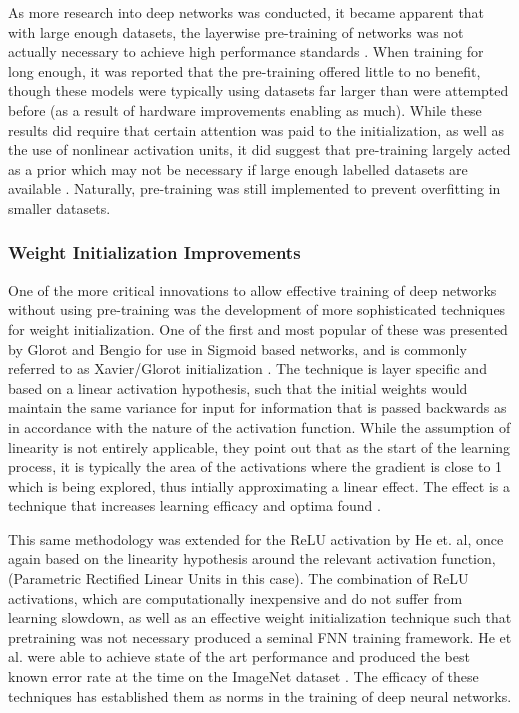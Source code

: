 \documentclass[a4paper,11pt,oneside]{article}
\theoremstyle{plain}
\theoremstyle{definition}
\begin{document}
As more research into deep networks was conducted, it became apparent that with large enough datasets, the
 layerwise pre-training of networks was not actually necessary to achieve high performance standards 
 \cite{ImageNet, Glorot2, Ciresan}. When training for long enough, it was reported that the pre-training offered little to no 
 benefit, though these models were typically using datasets far larger than were attempted before (as a result of
  hardware improvements enabling as much). While these results did require that certain attention was paid to the 
  initialization, as well as the use of nonlinear activation units, it did suggest that pre-training largely acted as a prior 
  which may not be necessary if large enough labelled datasets are available \cite{Bengio3}. Naturally, pre-training was still 
  implemented to prevent overfitting in smaller datasets.
\hfill \break 

\subsubsection{Weight Initialization Improvements}\label{lr_weight_init}

One of the more critical innovations to allow effective training of deep networks without using pre-training was the development of more sophisticated techniques for weight initialization. One of the first and most popular of these was presented by Glorot and Bengio for use in Sigmoid based networks, 
and is commonly referred to as Xavier/Glorot initialization \cite{Glorot}. The technique is layer specific and based on a linear activation
hypothesis, such that the initial weights would maintain the same variance for input for information that is passed backwards as in 
accordance with the nature of the activation function. While the assumption of linearity is not entirely applicable, they point out that as the 
start of the learning process, it is typically the area of the activations where the gradient is close to 1 which is being explored, thus intially approximating 
a linear effect. The effect is a technique that increases learning efficacy and optima found \cite{Glorot}. \newline

This same methodology was extended for the ReLU activation by He et. al, once again based on the linearity hypothesis around the 
relevant activation function, (Parametric Rectified Linear Units in this case). The combination of ReLU activations, which are computationally inexpensive and do not suffer from learning slowdown, as well as an effective weight initialization technique such that pretraining was not necessary produced a seminal FNN training framework. He et al. were able to 
achieve state of the art performance and produced the best known error rate at the time on the ImageNet dataset \cite{He}. The efficacy of these techniques has established 
them as norms in the training of deep neural networks.
\end{document}
